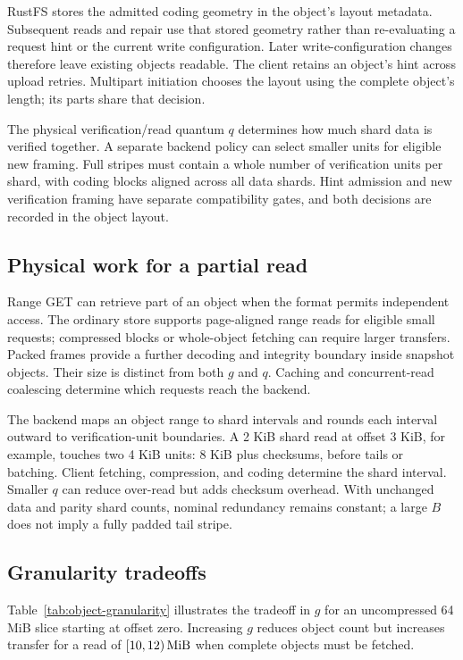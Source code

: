 RustFS stores the admitted coding geometry in the object's layout
metadata. Subsequent reads and repair use that stored geometry rather
than re-evaluating a request hint or the current write configuration.
Later write-configuration changes therefore leave existing objects
readable. The client retains an object's hint across upload retries.
Multipart initiation chooses the layout using the complete object's
length; its parts share that decision.

The physical verification/read quantum $q$ determines how much shard
data is verified together. A separate backend policy can select
smaller units for eligible new framing. Full stripes must contain
a whole number of verification units per shard, with coding blocks
aligned across all data shards. Hint admission and new verification
framing have separate compatibility gates, and both decisions are
recorded in the object layout.

\subsection{Physical work for a partial read}

Range GET can retrieve part of an object when the format permits
independent access. The ordinary store supports page-aligned range reads
for eligible small requests; compressed blocks or whole-object fetching
can require larger transfers. Packed frames provide a further decoding
and integrity boundary inside snapshot objects. Their size is distinct
from both $g$ and $q$. Caching and concurrent-read coalescing determine
which requests reach the backend.

The backend maps an object range to shard intervals and rounds each
interval outward to verification-unit boundaries. A 2 KiB shard read
at offset 3 KiB, for example, touches two 4 KiB units: 8 KiB plus
checksums, before tails or batching. Client fetching, compression, and
coding determine the shard interval. Smaller $q$ can reduce over-read
but adds checksum overhead. With unchanged data and parity shard counts,
nominal redundancy remains constant; a large $B$ does not imply a
fully padded tail stripe.

\subsection{Granularity tradeoffs}

Table~\ref{tab:object-granularity} illustrates the tradeoff in $g$ for an
uncompressed 64 MiB slice starting at offset zero. Increasing $g$ reduces
object count but increases transfer for a read of $[10,12)\,\mathrm{MiB}$ when
complete objects must be fetched.

